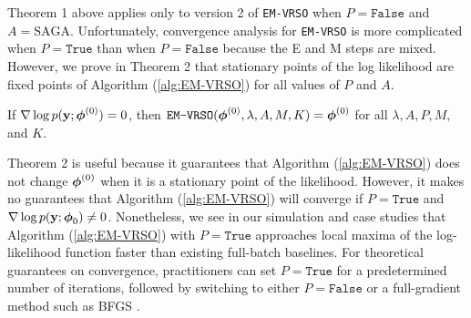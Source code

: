 

Theorem 1 above applies only to version 2 of \texttt{EM-VRSO} when $P = \texttt{False}$ and $A = \text{SAGA}$. Unfortunately, convergence analysis for \texttt{EM-VRSO} is more complicated when $P = \texttt{True}$ than when $P = \texttt{False}$ because the E and M steps are mixed. However, we prove in Theorem 2 that stationary points of the log likelihood are fixed points of Algorithm (\ref{alg:EM-VRSO}) for all values of $P$ and $A$.

\begin{theorem}
    If $\nabla \log p(\mathbf{y};\boldsymbol{\phi}^{(0)}) = 0$, then $\texttt{EM-VRSO}(\boldsymbol{\phi}^{(0)}, \lambda, A, M, K) = \boldsymbol{\phi}^{(0)}$ for all $\lambda, A, P, M,$ and $K$.
\end{theorem}

Theorem 2 is useful because it guarantees that Algorithm (\ref{alg:EM-VRSO}) does not change $\boldsymbol{\phi}^{(0)}$ when it is a stationary point of the likelihood. However, it makes no guarantees that Algorithm (\ref{alg:EM-VRSO}) will converge if $P = \texttt{True}$ and $\nabla \log p(\mathbf{y};\boldsymbol{\phi}_0) \neq 0$. Nonetheless, we see in our simulation and case studies that Algorithm (\ref{alg:EM-VRSO}) with $P = \texttt{True}$ approaches local maxima of the log-likelihood function faster than existing full-batch baselines. For theoretical guarantees on convergence, practitioners can set $P = \texttt{True}$ for a predetermined number of iterations, followed by switching to either $P = \texttt{False}$ or a full-gradient method such as BFGS \citep{Fletcher:2000}.


